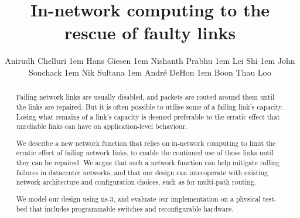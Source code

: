 \documentclass[sigconf]{acmart}
\begin{document}
\title{In-network computing to the rescue of faulty links}

\author{Anirudh Chelluri \kern1em
 Hans Giesen \kern1em
 Nishanth Prabhu \kern1em
 Lei Shi \kern1em
 John Sonchack \kern1em
 Nik Sultana \kern1em
 Andr\'e DeHon \kern1em
 Boon Thau Loo 
}

%
%
%
%


\renewcommand{\shortauthors}{A. Chelluri et al.}

\begin{abstract}
Failing network links are usually disabled, and packets are routed around them
until the links are repaired.  But it is often possible
to utilise some of a failing link's capacity. Losing what remains of a link's
capacity is deemed preferable to the erratic effect that unreliable links can
have on application-level behaviour.

We describe a new network function that relies on in-network computing to limit
the erratic effect of failing network links, to enable the continued use of
those links until they can be repaired. We argue that such a network function
can help mitigate rolling failures in datacenter networks, and that our design
can interoperate with existing network architecture and configuration choices,
such as for multi-path routing.

We model our design using ns-3, and evaluate our implementation on a physical
test-bed that includes programmable switches and reconfigurable hardware.
\end{abstract}
\end{document}
